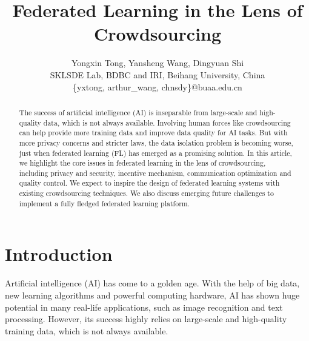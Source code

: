 \documentclass[11pt]{article}
\begin{document}
\title{Federated Learning in the Lens of Crowdsourcing}
\author{
        Yongxin Tong,
        Yansheng Wang,
	    Dingyuan Shi \\
	    SKLSDE Lab, BDBC and IRI, Beihang University, China\\
		\{yxtong, arthur\_wang, chnsdy\}@buaa.edu.cn
}

\maketitle

\begin{abstract}
The success of artificial intelligence (AI) is inseparable from large-scale and high-quality data, which is not always available.
Involving human forces like crowdsourcing can help provide more training data and improve data quality for AI tasks.
But with more privacy concerns and stricter laws, the data isolation problem is becoming worse, just when federated learning (FL) has emerged as a promising solution. 
In this article, we highlight the core issues in federated learning in the lens of crowdsourcing, including privacy and security, incentive mechanism, communication optimization and quality control.
We expect to inspire the design of federated learning systems with existing crowdsourcing techniques.
We also discuss emerging future challenges to implement a fully fledged federated learning platform.
\end{abstract}

\section{Introduction}
Artificial intelligence (AI) has come to a golden age. With the help of big data, new learning algorithms and powerful computing hardware, AI has shown huge potential in many real-life applications, such as image recognition and text processing. 
However, its success highly relies on large-scale and high-quality training data, which is not always available. 
\end{document}
